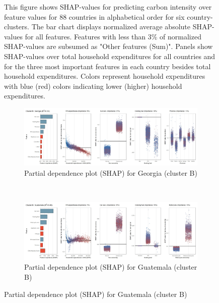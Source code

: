 \begin{figure}[ht!]
    \begin{subcaption2}
     This figure shows SHAP-values for predicting carbon intensity over feature values for 88 countries in alphabetical order for six country-clusters. The bar chart displays normalized average absolute SHAP-values for all features. Features with less than 3\% of normalized SHAP-values are subsumed as "Other features (Sum)". Panels show SHAP-values over total household expenditures for all countries and for the three most important features in each country besides total household expenditures. Colors represent household expenditures with blue (red) colors indicating lower (higher) household expenditures.
     \end{subcaption2}
\end{figure}

\begin{figure}[ht!]\ContinuedFloat
    \centering
   \begin{subfigure}[b]{\textwidth}
   \centering
         \caption{Partial dependence plot (SHAP) for Georgia (cluster B)}
         \label{fig:5b_GEO}
         \includegraphics[width=\textwidth]{Figure 5b/Figure_5b_GEO}
         \end{subfigure}
    \\
    \vspace{0.5cm}
    \begin{subfigure}[b]{\textwidth}
           \centering
         \caption{Partial dependence plot (SHAP) for Guatemala (cluster B)}
         \label{fig:5b_GTM}
         \includegraphics[width=\textwidth]{Figure 5b/Figure_5b_GTM}
         \end{subfigure}

\end{figure}
